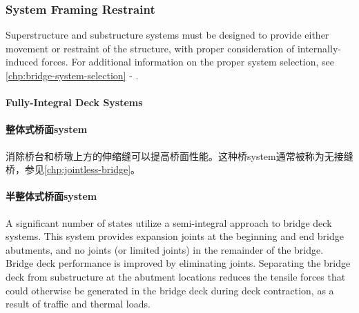 \subsubsection{System Framing Restraint}
Superstructure and substructure systems must be designed to provide either movement or restraint of the structure, with proper consideration of internally-induced forces. For additional information on the proper system selection, see \cref{chp:bridge-system-selection} - .

\paragraph{Fully-Integral Deck Systems}
\paragraph{整体式桥面\gls*{system}}
消除桥台和桥墩上方的伸缩缝可以提高桥面性能。这种桥\gls*{system}通常被称为无接缝桥，参见\cref{chp:jointless-bridge}。

\paragraph{半整体式桥面\gls*{system}}
A significant number of states utilize a semi-integral approach to bridge deck systems. This system provides expansion joints at the beginning and end bridge abutments, and no joints (or limited joints) in the remainder of the bridge. Bridge deck performance is improved by eliminating joints. Separating the bridge deck from substructure at the abutment locations reduces the tensile forces that could otherwise be generated in the bridge deck during deck contraction, as a result of traffic and thermal loads.


